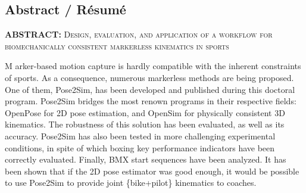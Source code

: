 {}

\vspace*{-1.6cm}
\begin{flushright}
\section*{\fontsize{20pt}{20pt}\selectfont\textnormal{Abstract / Résumé}}
\end{flushright}
\vspace{-.2cm}

\chead[\fancyplain{}{}]
      {\fancyplain{}{}}
\lfoot[\fancyplain{}{}]%
      {\fancyplain{}{}}
\cfoot[\fancyplain{}{\thepage}]
      {\fancyplain{}{\thepage}}
\rfoot[\fancyplain{}{}]%
     {\fancyplain{}{\scriptsize}}
     


\vspace*{3cm}

\noindent\textbf{ABSTRACT: } \textsc{Design, evaluation, and application of a workflow for biomechanically consistent markerless kinematics in sports}

\lettrine[lines=1]{M}{ }arker-based motion capture is hardly compatible with the inherent constraints of sports. As a consequence, numerous markerless methods are being proposed. One of them, Pose2Sim, has been developed and published during this doctoral program. Pose2Sim bridges the most renown programs in their respective fields: OpenPose for 2D pose estimation, and OpenSim for physically consistent 3D kinematics. The robustness of this solution has been evaluated, as well as its accuracy. Pose2Sim has also been tested in more challenging experimental conditions, in spite of which boxing key performance indicators have been correctly evaluated. Finally, BMX start sequences have been analyzed. It has been shown that if the 2D pose estimator was good enough, it would be possible to use Pose2Sim to provide joint \{bike+pilot\} kinematics to coaches.

